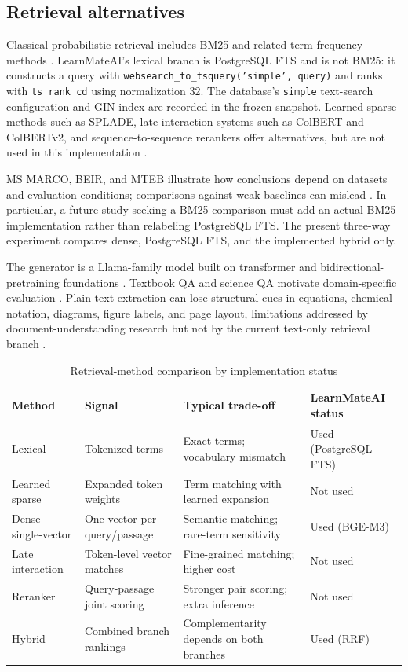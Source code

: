 \documentclass[conference]{IEEEtran}
\begin{document}
\subsection{Retrieval alternatives}
Classical probabilistic retrieval includes BM25 and related term-frequency methods \cite{r5,r51}. LearnMateAI's lexical branch is PostgreSQL FTS and is not BM25: it constructs a query with \texttt{websearch\_to\_tsquery('simple', query)} and ranks with \texttt{ts\_rank\_cd} using normalization 32. The database's \texttt{simple} text-search configuration and GIN index are recorded in the frozen snapshot. Learned sparse methods such as SPLADE, late-interaction systems such as ColBERT and ColBERTv2, and sequence-to-sequence rerankers offer alternatives, but are not used in this implementation \cite{r38,r39,r40,r46}.

MS MARCO, BEIR, and MTEB illustrate how conclusions depend on datasets and evaluation conditions; comparisons against weak baselines can mislead \cite{r8,r47,r52,r53}. In particular, a future study seeking a BM25 comparison must add an actual BM25 implementation rather than relabeling PostgreSQL FTS. The present three-way experiment compares dense, PostgreSQL FTS, and the implemented hybrid only.

The generator is a Llama-family model built on transformer and bidirectional-pretraining foundations \cite{r54,r55,r56}. Textbook QA and science QA motivate domain-specific evaluation \cite{r2,r3}. Plain text extraction can lose structural cues in equations, chemical notation, diagrams, figure labels, and page layout, limitations addressed by document-understanding research but not by the current text-only retrieval branch \cite{r57,r58,r59}.

\begin{table}[t]
\caption{Retrieval-method comparison by implementation status}
\label{tab:retrieval-methods}
\centering\footnotesize
\begin{tabular}{p{}p{}p{}p{}}
\hline
Method & Signal & Typical trade-off & LearnMateAI status\\ \hline
Lexical & Tokenized terms & Exact terms; vocabulary mismatch & Used (PostgreSQL FTS)\\
Learned sparse & Expanded token weights & Term matching with learned expansion & Not used\\
Dense single-vector & One vector per query/passage & Semantic matching; rare-term sensitivity & Used (BGE-M3)\\
Late interaction & Token-level vector matches & Fine-grained matching; higher cost & Not used\\
Reranker & Query-passage joint scoring & Stronger pair scoring; extra inference & Not used\\
Hybrid & Combined branch rankings & Complementarity depends on both branches & Used (RRF)\\ \hline
\end{tabular}
\end{table}
\end{document}

